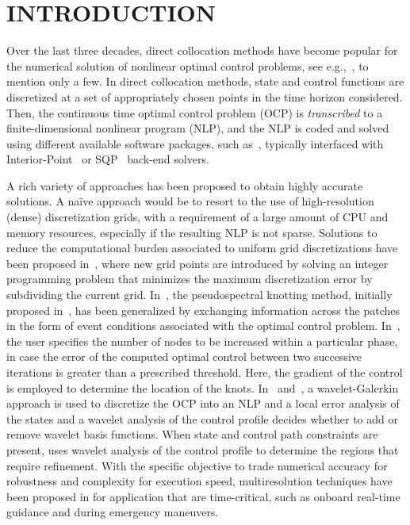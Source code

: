 \section*{INTRODUCTION}

Over the last three decades, direct collocation methods have become popular for the numerical solution of nonlinear optimal control problems, see e.g.,~\cite{Fahroo:JGCD:2002,Elnager:TAC:1995,Fahroo:JAS:2000,Gong:AAS:2006}, to mention only a few. In direct collocation methods, state and control functions are discretized at a set of appropriately chosen points in the time horizon considered. Then, the continuous time optimal control problem (OCP) is \emph{transcribed} to a finite-dimensional nonlinear program (NLP), and the NLP is coded and solved using different available software packages, such as~\cite{casadi:MPC:2019, Rao:TMS:2010,GPOPSII:TMS:2013}, typically interfaced with Interior-Point~\cite{Biegler:CCE:2009} or SQP~\cite{SNOPT:SIAMReview:2005} back-end solvers.

A rich variety of approaches has been proposed to obtain highly accurate solutions. A na\"{i}ve approach would be to resort to the use of high-resolution (dense) discretization grids, with a requirement of a large amount of CPU and memory resources, especially if the resulting NLP is not sparse. Solutions to reduce the computational burden associated to uniform grid discretizations have been proposed in~\cite{Betts:JCAM:2000}, where new grid points are introduced by solving an integer programming problem that minimizes the
maximum discretization error by subdividing the current grid. In~\cite{Ross:AAS:2003}, the pseudospectral knotting method, initially proposed in~\cite{Fahroo:ASC:2000}, has been generalized by exchanging information across the patches in the form of event conditions associated with the optimal control problem. In~\cite{Gong:AAS:2006}, the user specifies the number of nodes to be increased within a particular phase, in case the error of the computed optimal control between two successive iterations is
greater than a prescribed threshold. Here, the
gradient of the control is employed to determine the location of
the knots. In~\cite{Binder:CCE:2000} and~\cite{Binder:TechRep:2000}, a wavelet-Galerkin approach is used to discretize the OCP into an NLP and a local error analysis of the states and a wavelet analysis of the
control profile decides whether to add or remove wavelet basis functions. When state and control path constraints are present, \cite{Schlegel:CCE:2005}  uses wavelet analysis of the control profile to determine the
regions that require refinement.
With the specific objective to trade numerical accuracy for robustness and complexity for execution speed, multiresolution techniques have been proposed in \cite{Jain:CDC:2007,Jain:JGCD:2008} for application that are time-critical, such as onboard real-time guidance and during emergency maneuvers.

